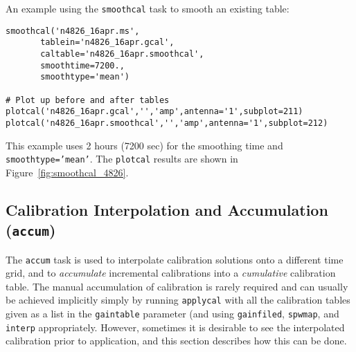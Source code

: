 An example using the {\tt smoothcal} task to smooth an existing table:
\small
\begin{verbatim}
smoothcal('n4826_16apr.ms',
       tablein='n4826_16apr.gcal',
       caltable='n4826_16apr.smoothcal',
       smoothtime=7200.,
       smoothtype='mean')

# Plot up before and after tables
plotcal('n4826_16apr.gcal','','amp',antenna='1',subplot=211)
plotcal('n4826_16apr.smoothcal','','amp',antenna='1',subplot=212)
\end{verbatim}
\normalsize
This example uses 2 hours (7200 sec) for the smoothing time and
{\tt smoothtype='mean'}.  The {\tt plotcal} results are shown
in Figure~\ref{fig:smoothcal_4826}.


\subsection{Calibration Interpolation and Accumulation ({\tt accum})}
\label{section:cal.tables.accum}

The {\tt accum} task is used to interpolate calibration solutions onto
a different time grid, and to {\it accumulate} incremental
calibrations into a {\it cumulative} calibration table.  The manual
accumulation of calibration is rarely required and can usually be
achieved implicitly simply by running {\tt applycal} with all the
calibration tables given as a list in the {\tt gaintable} parameter
(and using {\tt gainfiled}, {\tt spwmap}, and {\tt interp}
appropriately.  However, sometimes it is desirable to see the
interpolated calibration prior to application, and this section
describes how this can be done.

